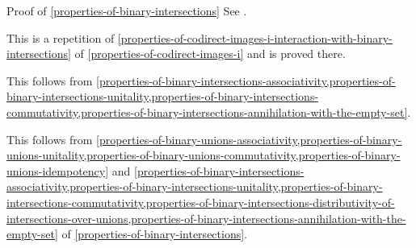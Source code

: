 \begin{Proof}{Proof of \cref{properties-of-binary-intersections}}
    See \cite{proof-wiki:preimage-of-intersection-under-mapping}.

    This is a repetition of \cref{properties-of-codirect-images-i-interaction-with-binary-intersections} of \cref{properties-of-codirect-images-i} and is proved there.

    This follows from \cref{properties-of-binary-intersections-associativity,properties-of-binary-intersections-unitality,properties-of-binary-intersections-commutativity,properties-of-binary-intersections-annihilation-with-the-empty-set}.

    This follows from \cref{properties-of-binary-unions-associativity,properties-of-binary-unions-unitality,properties-of-binary-unions-commutativity,properties-of-binary-unions-idempotency} and \cref{properties-of-binary-intersections-associativity,properties-of-binary-intersections-unitality,properties-of-binary-intersections-commutativity,properties-of-binary-intersections-distributivity-of-intersections-over-unions,properties-of-binary-intersections-annihilation-with-the-empty-set} of \cref{properties-of-binary-intersections}.
\end{Proof}
